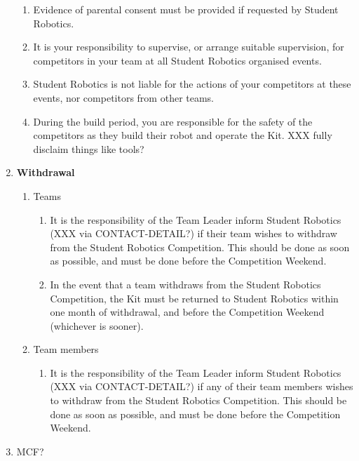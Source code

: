 \documentclass[a4paper, 11pt]{scrartcl}
\begin{document}
\begin{enumerate}
\begin{enumerate}
\item Evidence of parental consent must be provided if requested by Student
Robotics.

\item It is your responsibility to supervise, or arrange suitable supervision,
for competitors in your team at all Student Robotics organised events.

\item Student Robotics is not liable for the actions of your competitors at
these events, nor competitors from other teams.

\item During the build period, you are responsible for the safety of the
competitors as they build their robot and operate the Kit. XXX fully disclaim
things like tools?

\end{enumerate}

\item \textbf{Withdrawal}
\begin{enumerate}

\item Teams
\begin{enumerate}
\item It is the responsibility of the Team Leader inform
Student Robotics (XXX via CONTACT-DETAIL?) if their team wishes to withdraw
from the Student Robotics Competition. This should be done as soon as possible,
and must be done before the Competition Weekend.

\item In the event that a team withdraws from the Student Robotics Competition,
the Kit must be returned to Student Robotics within one month of withdrawal,
and before the Competition Weekend (whichever is sooner).
\end{enumerate}

\item Team members
\begin{enumerate}
\item It is the responsibility of the Team Leader inform Student Robotics
(XXX via CONTACT-DETAIL?) if any of their team members wishes to withdraw
from the Student Robotics Competition. This should be done as soon as possible,
and must be done before the Competition Weekend.
\end{enumerate}

\end{enumerate}

\item MCF?

\end{enumerate}
\end{document}
